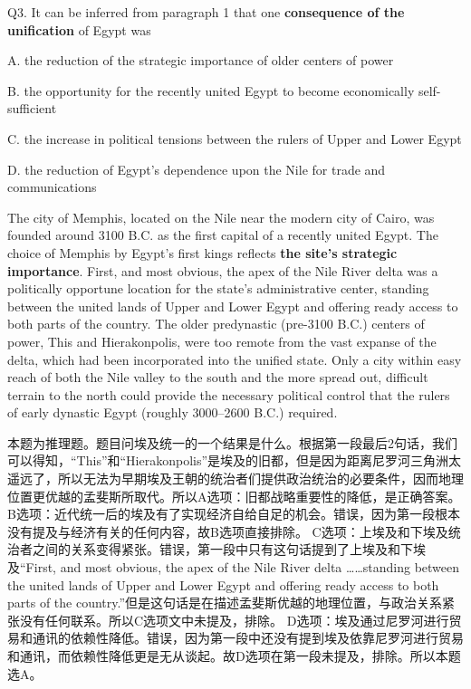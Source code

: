 \begin{blk}
    \begin{qst}
        Q3. It can be inferred from paragraph 1 that one \textbf{consequence of the unification} of Egypt was
    \end{qst}

    \begin{chc}
        A. the reduction of the strategic importance of older centers of power

        B. the opportunity for the recently united Egypt to become economically self-sufficient

        C. the increase in political tensions between the rulers of Upper and Lower Egypt

        D. the reduction of Egypt’s dependence upon the Nile for trade and communications
    \end{chc}

    \begin{psgq}
        The city of Memphis, located on the Nile near the modern city of Cairo, was founded around 3100 B.C. as the first capital of a recently united Egypt. The choice of Memphis by Egypt’s first kings reflects \textbf{the site’s strategic importance}. First, and most obvious, the apex of the Nile River delta was a politically opportune location for the state’s administrative center, standing between the united lands of Upper and Lower Egypt and offering ready access to both parts of the country. The older predynastic (pre-3100 B.C.) centers of power, This and Hierakonpolis, were too remote from the vast expanse of the delta, which had been incorporated into the unified state. Only a city within easy reach of both the Nile valley to the south and the more spread out, difficult terrain to the north could provide the necessary political control that the rulers of early dynastic Egypt (roughly 3000–2600 B.C.) required.
    \end{psgq}

    \begin{nlz}
        本题为推理题。题目问埃及统一的一个结果是什么。根据第一段最后2句话，我们可以得知，“This”和“Hierakonpolis”是埃及的旧都，但是因为距离尼罗河三角洲太遥远了，所以无法为早期埃及王朝的统治者们提供政治统治的必要条件，因而地理位置更优越的孟斐斯所取代。所以A选项：旧都战略重要性的降低，是正确答案。 B选项：近代统一后的埃及有了实现经济自给自足的机会。错误，因为第一段根本没有提及与经济有关的任何内容，故B选项直接排除。 C选项：上埃及和下埃及统治者之间的关系变得紧张。错误，第一段中只有这句话提到了上埃及和下埃及“First, and most obvious, the apex of the Nile River delta ……standing between the united lands of Upper and Lower Egypt and offering ready access to both parts of the country.”但是这句话是在描述孟斐斯优越的地理位置，与政治关系紧张没有任何联系。所以C选项文中未提及，排除。 D选项：埃及通过尼罗河进行贸易和通讯的依赖性降低。错误，因为第一段中还没有提到埃及依靠尼罗河进行贸易和通讯，而依赖性降低更是无从谈起。故D选项在第一段未提及，排除。所以本题选A。
    \end{nlz}
\end{blk}

